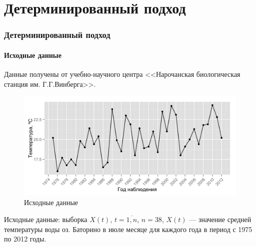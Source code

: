 \documentclass{beamer}
\begin{document}
\section{Детерминированный подход}
\begin{frame}
  \frametitle{Детерминированный подход}
  \framesubtitle{Исходные данные}
  \begin{multicols}{2}
    Данные получены от учебно-научного центра <<Нарочанская биологическая станция им. Г.Г.Винберга>>.
    
    \columnbreak
    
    \begin{figure}[h]
      \includegraphics[width=\columnwidth]{../../figures/source.png}
      \caption{Исходные данные}
    \end{figure}
  \end{multicols}
  Исходные данные: выборка $ X(t) $, $ t = \overline{1,n} $, $ n = 38 $, $ X(t) $ --- значение средней температуры воды оз. Баторино в июле месяце для каждого года в период с 1975 по 2012 годы.
\end{frame}
\end{document}
